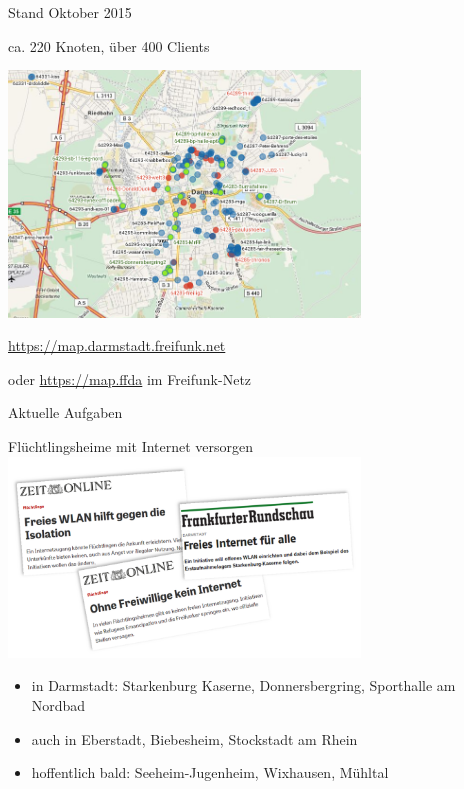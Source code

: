 \documentclass[handout, 10pt]{beamer}
\begin{document}
\begin{frame}{Stand Oktober 2015}
	\begin{center}
		\vfill
		ca. 220 Knoten, über 400 Clients
		\begin{center}
			\includegraphics[width=0.7\textwidth]{images/2015-10-03_darmstadt-map}
		\end{center}

		\vfill
		\url{https://map.darmstadt.freifunk.net}
		
		\tiny oder \url{https://map.ffda} im Freifunk-Netz
	\end{center}	
\end{frame}

\begin{frame}{Aktuelle Aufgaben}
	\begin{center}
		\large Flüchtlingsheime mit Internet versorgen \\
		\includegraphics[width=0.7\textwidth]{images/2015-10_presse-fluechtlinge}
	\end{center}
	\begin{itemize}[<+->]
		\item in Darmstadt: Starkenburg Kaserne, Donnersbergring, Sporthalle am Nordbad
		\item auch in Eberstadt, Biebesheim, Stockstadt am Rhein
		\item hoffentlich bald: Seeheim-Jugenheim, Wixhausen, Mühltal
	\end{itemize}	
\end{frame}	
\end{document}
